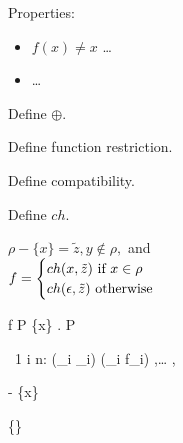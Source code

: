 Properties:
\begin{itemize}
  \item $f(x) \neq x$ \dots
  \item \dots
\end{itemize}

Define $\oplus$.

Define function restriction.

Define compatibility.

Define $ch{}$.



  {\judgement{}{}{\anullproc}}

  {}

  {\begin{varwidth}{6cm}
    $ \rho - \{x\} = \tilde{z}, y \notin \rho,$ and \\
    $ f =
      \begin{cases}
        ch(x, \tilde{z}) \text{ if } x \in \rho \\
        ch(\epsilon, \tilde{z}) \text{ otherwise }
      \end{cases} $
   \end{varwidth}}
  {\judgement
    {\rho}
    {f}
    {P}}
  {\judgement
    {\{x\} \cup {}}
    {}
    { . P}}

  {\forall\ 1 \leq i \leq n:
    }
  {\judgement
    {(\cup_i \rho_i)}
    {(\oplus_i f_i)}
    {
      {
      ,\ldots
      ,}}}

  {}
  {}
  {}

  {}
  {\judgement
    {\rho - \{x\}}
    {}
    {}}

  {\judgement
    {\{\}}
    {}
    {}}




